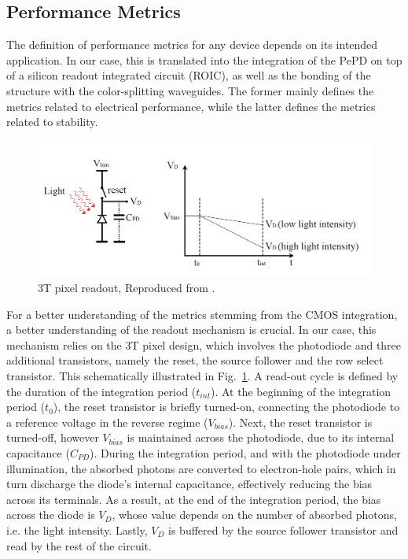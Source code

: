 \subsection{Performance Metrics}

The definition of performance metrics for any device depends on its intended application. In our case, this is translated into the integration of the PePD on top of a silicon readout integrated circuit (ROIC), as well as the bonding of the structure with the color-splitting waveguides. The former mainly defines the metrics related to electrical performance, while the latter defines the metrics related to stability. 

\begin{figure}
  \centering
  \medskip
  \includegraphics[width=.99\textwidth]{chapters/introduction/image/3T_pixel_readout.png}
  \caption[Short caption for Table of Figures]{3T pixel readout, Reproduced from \cite{Pejovic2023ColloidalInfrared}.}
  \label{fig:ch2:readout}
\end{figure}

For a better understanding of the metrics stemming from the CMOS integration, a better understanding of the readout mechanism is crucial. In our case, this mechanism relies on the 3T pixel design, which involves the photodiode and three additional transistors, namely the reset, the source follower and the row select transistor. This schematically illustrated in Fig.~\ref{fig:ch2:readout}. A read-out cycle is defined by the duration of the  integration period ($t_{int}$). At the beginning of the integration period ($t_0$), the reset transistor is briefly turned-on, connecting the photodiode to a reference voltage in the reverse regime ($V_{bias}$). Next, the reset transistor is turned-off, however $V_{bias}$ is maintained across the photodiode, due to its internal capacitance ($C_{PD}$). During the integration period, and with the photodiode under illumination, the absorbed photons are converted to electron-hole pairs, which in turn discharge the diode's internal capacitance, effectively reducing the bias across its terminals. As a result, at the end of the integration period, the bias across the diode is $V_D$, whose value depends on the number of absorbed photons, i.e. the light intensity. Lastly, $V_D$ is buffered by the source follower transistor and read by the rest of the circuit. 

